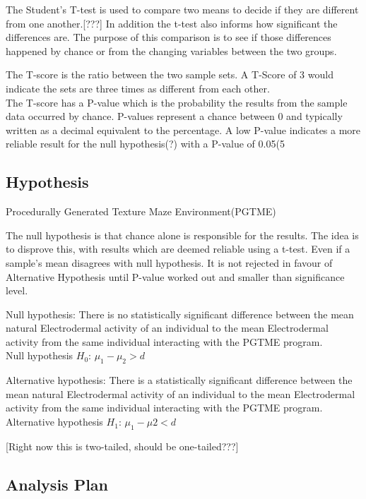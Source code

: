 \documentclass{report}
\begin{document}
The Student's T-test is used to compare two means to decide if they are different from one another.[???] In addition the t-test also informs how significant
the differences are. The purpose of this comparison is to see if those differences happened by chance or from the changing variables between the two groups.

The T-score is the ratio between the two sample sets. A T-Score of 3 would indicate the sets are three times as different from each other.\\
The T-score has a P-value which is the probability the results from the sample data occurred by chance. P-values represent a chance between 0%
and typically written as a decimal equivalent to the percentage. A low P-value indicates a more reliable result for the null hypothesis(?) with a P-value
of 0.05(5%

\subsection{Hypothesis}

Procedurally Generated Texture Maze Environment(PGTME)

The null hypothesis is that chance alone is responsible for the results. The idea is to disprove this, with results which are deemed reliable using a t-test.
Even if a sample's mean disagrees with null hypothesis. It is not rejected in favour of Alternative Hypothesis until P-value worked out and smaller than significance level.

Null hypothesis: There is no statistically significant difference between the mean natural Electrodermal activity of an individual to the mean Electrodermal activity from the same individual interacting with the PGTME program.\\
Null hypothesis $H_0$: $\mu_1 - \mu_2 > d$

Alternative hypothesis: There is a statistically significant difference between the mean natural Electrodermal activity of an individual to the mean Electrodermal activity from the same individual interacting with the PGTME program.\\
Alternative hypothesis $H_1$: $\mu_1 - \mu2 < d$

[Right now this is two-tailed, should be one-tailed???]

\subsection{Analysis Plan}
\end{document}
